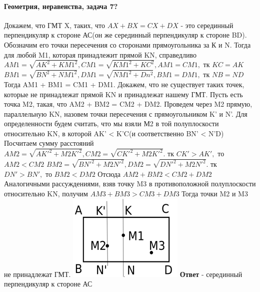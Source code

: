 \documentclass{article}
\begin{document}
	\paragraph{Геометрия, неравенства, задача 7?}\hspace{\fill}
	\newline
	Докажем, что ГМТ X, таких, что $AX + BX = CX + DX$ - это серединный перпендикуляр к стороне АС(он же серединный перпендикуляр к стороне BD). Обозначим его точки пересечения со сторонами прямоугольника за К и N. 
	Тогда для любой M1, которая принадлежит прямой KN, справедливо \newline
	$AM1 = \sqrt{AK^2 + KM1^2}, CM1 = \sqrt{KM1^2 + KC^2}, AM1 = CM1, $ тк $  KC = AK$
	\newline
	$BM1 = \sqrt{BN^2 + NM1^2}, DM1 = \sqrt{NM1^2 + Dn^2}, BM1 = DM1, $ тк $  NB = ND$	
	\newline
	Тогда AM1 + BM1 = CM1 + DM1.
	\newline
	Докажем, что не существует таких точек, которые не принадлежат прямой KN и принадлежат нашему ГМТ.
	\newline
	Пусть есть точка M2, такая, что AM2 + BM2 = CM2 + DM2. Проведем через M2 прямую, параллельную KN, назовем точки пересечения с прямоугольником K' и N'. Для определенности будем считать, что мы взяли М2 в той полуплоскости относительно KN, в которой AK' < K'C(и соответственно BN' < N'D)
	\newline
	Посчитаем сумму расстояний 
	\newline
	$AM2 = \sqrt{AK'^2 + M2K'^2}, CM2 = \sqrt{CK'^2 + M2K'^2}. $ тк $CK' > AK', $ то $AM2 < CM2$
	\newline	
	$BM2 = \sqrt{BN'^2 + M2N'^2}, DM2 = \sqrt{DN'^2 + M2N'^2}. $ тк $DN' > BN', $ то $BM2 < DM2$
	\newline
	Отсюда $AM2 + BM2 < CM2 + DM2$
	\newline
	Аналогичными рассуждениями, взяв точку M3 в противоположной полуплоскости относительно KN, получим $AM3 + BM3 > CM3 + DM3$
	Тогда точки M2 и M3 не принадлежат ГМТ.
	\newline
	\includegraphics{rect1.png}
	\newline
	\textbf{Ответ} - серединный перпендикуляр к стороне АС
\end{document}
